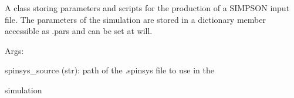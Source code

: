 \documentclass[letterpaper,10pt,english]{sphinxmanual}
\begin{document}
\begin{fulllineitems}
\label{doctree/soprano.calculate.nmr.simpson:soprano.calculate.nmr.simpson.SimpsonSequence}
A class storing parameters and scripts for the production of a SIMPSON
input file. The parameters of the simulation are stored in a dictionary
member accessible as .pars and can be set at will.

\begin{DUlineblock}{0em}
\item[] Args:
\item[]
\begin{DUlineblock}{\DUlineblockindent}
\item[] spinsys\_source (str): path of the .spinsys file to use in the
\item[]
\begin{DUlineblock}{\DUlineblockindent}
\item[] simulation
\end{DUlineblock}
\end{DUlineblock}
\end{DUlineblock}

\begin{fulllineitems}
\label{doctree/soprano.calculate.nmr.simpson:soprano.calculate.nmr.simpson.SimpsonSequence.apply_custom_template}
\end{fulllineitems}


\begin{fulllineitems}
\label{doctree/soprano.calculate.nmr.simpson:soprano.calculate.nmr.simpson.SimpsonSequence.apply_template}
\end{fulllineitems}


\begin{fulllineitems}
\label{doctree/soprano.calculate.nmr.simpson:soprano.calculate.nmr.simpson.SimpsonSequence.set_parameters}
\end{fulllineitems}


\end{fulllineitems}
\end{document}
